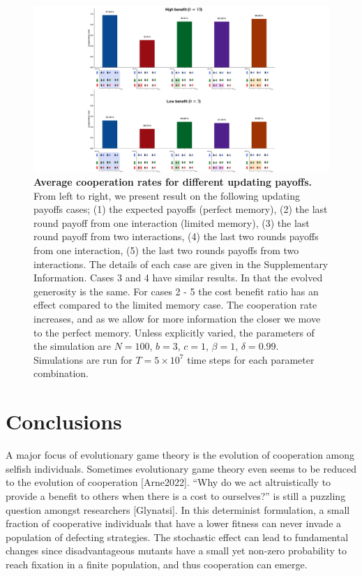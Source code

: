 \documentclass[11pt]{article}
\theoremstyle{plainCl1}
\theoremstyle{plainCl2}
\begin{document}
\begin{figure}[!htbp]
  \centering
  \includegraphics[width=\textwidth]{static/more_memory_summary_results.pdf}
  \caption{{\bf Average cooperation rates for different updating payoffs.}
  From left to right, we present result on the following updating payoffs cases;
  (1) the expected payoffs (perfect memory), (2) the last round payoff from one
  interaction (limited memory), (3) the last round payoff from two interactions,
  (4) the last two rounds payoffs from one interaction, (5) the last two rounds
  payoffs from two interactions. The details of each case are given in the
  Supplementary Information. Cases 3 and 4 have similar results. In that the
  evolved generosity is the same. For cases 2 - 5 the cost benefit ratio
  has an effect compared to the limited memory case. The cooperation rate
  increases, and as we allow for more information the closer we move to the
  perfect memory. Unless explicitly varied, the parameters of the simulation are
  $N\!=\!100$, $b\!=\!3$, $c\!=\!1$, $\beta\!=\!1$, $\delta\!=\!0.99$.
  Simulations are run for $T\!=\!5\times 10^7$ time steps for each parameter
  combination.}\label{fig:cooperation_rate_all_updating_payoffs}
\end{figure}

\newpage

\section{Conclusions}\label{section:conclusions}

A major focus of evolutionary game theory is the evolution of cooperation among
selfish individuals. Sometimes evolutionary game theory even seems to be reduced
to the evolution of cooperation [Arne2022]. “Why do we act altruistically to
provide a benefit to others when there is a cost to ourselves?” is still a
puzzling question amongst researchers [Glynatsi]. In this determinist
formulation, a small fraction of cooperative individuals that have a lower
fitness can never invade a population of defecting strategies.  The stochastic
effect can lead to fundamental changes since disadvantageous mutants have a
small yet non-zero probability to reach fixation in a finite population, and
thus cooperation can emerge.
\end{document}

